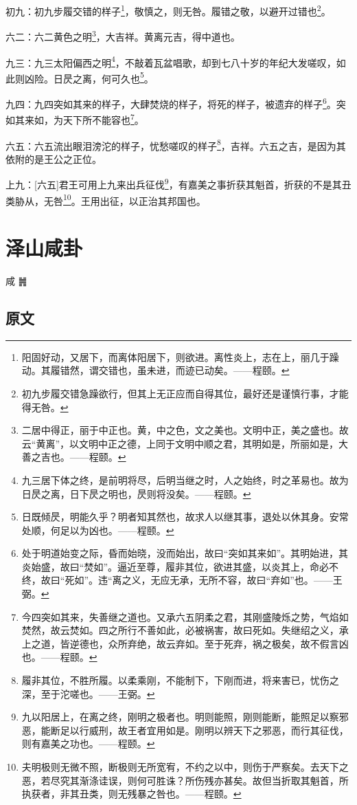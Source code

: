 \documentclass[12pt,oneside]{book}
\begin{document}
初九：初九步履交错的样子\footnote{阳固好动，又居下，而离体阳居下，则欲进。离性炎上，志在上，丽几于躁动。其履错然，谓交错也，虽未进，而迹已动矣。——程颐。}，敬慎之，则无咎。履错之敬，以避开过错也\footnote{初九步履交错急躁欲行，但其上无正应而自得其位，最好还是谨慎行事，才能得无咎。}。

六二：六二黄色之明\footnote{二居中得正，丽于中正也。黄，中之色，文之美也。文明中正，美之盛也。故云“黄离”，以文明中正之德，上同于文明中顺之君，其明如是，所丽如是，大善之吉也。——程颐。}，大吉祥。黄离元吉，得中道也。

九三：九三太阳偏西之明\footnote{九三居下体之终，是前明将尽，后明当继之时，人之始终，时之革易也。故为日昃之离，日下昃之明也，昃则将没矣。——程颐。}，不敲着瓦盆唱歌，却到七八十岁的年纪大发嗟叹，如此则凶险。日昃之离，何可久也\footnote{日既倾昃，明能久乎？明者知其然也，故求人以继其事，退处以休其身。安常处顺，何足以为凶也。——程颐。}。

九四：九四突如其来的样子，大肆焚烧的样子，将死的样子，被遗弃的样子\footnote{处于明道始变之际，昏而始晓，没而始出，故曰“突如其来如”。其明始进，其炎始盛，故曰“焚如”。逼近至尊，履非其位，欲进其盛，以炎其上，命必不终，故曰“死如”。违“离之义，无应无承，无所不容，故曰“弃如”也。——王弼。}。突如其来如，为天下所不能容也\footnote{今四突如其来，失善继之道也。又承六五阴柔之君，其刚盛陵烁之势，气焰如焚然，故云焚如。四之所行不善如此，必被祸害，故曰死如。失继绍之义，承上之道，皆逆德也，众所弃绝，故云弃如。至于死弃，祸之极矣，故不假言凶也。——程颐。}。

六五：六五流出眼泪滂沱的样子，忧愁嗟叹的样子\footnote{履非其位，不胜所履。以柔乘刚，不能制下，下刚而进，将来害已，忧伤之深，至于沱嗟也。——王弼。}，吉祥。六五之吉，是因为其依附的是王公之正位。

上九：[六五]君王可用上九来出兵征伐\footnote{九以阳居上，在离之终，刚明之极者也。明则能照，刚则能断，能照足以察邪恶，能断足以行威刑，故王者宜用如是。刚明以辨天下之邪恶，而行其征伐，则有嘉美之功也。——程颐。}，有嘉美之事折获其魁首，折获的不是其丑类胁从，无咎\footnote{夫明极则无微不照，断极则无所宽宥，不约之以中，则伤于严察矣。去天下之恶，若尽究其渐涤诖误，则何可胜诛？所伤残亦甚矣。故但当折取其魁首，所执获者，非其丑类，则无残暴之咎也。——程颐。}。王用出征，以正治其邦国也。


\chapter{泽山咸卦}
咸 {\Large ䷞}

\section{原文}
\end{document}
